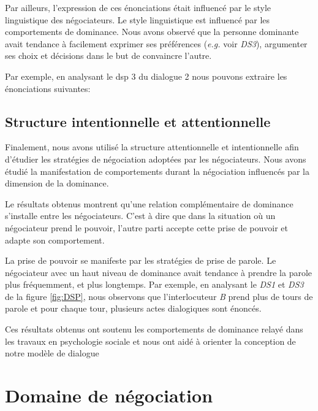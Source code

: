				 Par ailleurs, l'expression de ces énonciations était influencé par le style linguistique des négociateurs.  Le style linguistique est influencé par les comportements de dominance. Nous avons observé que la personne dominante avait tendance à facilement exprimer ses préférences (\emph{e.g.} voir \emph{DS3}), argumenter ses choix et décisions dans le but de convaincre l'autre.  
				 
				 
				  Par exemple, en analysant le dsp 3 du dialogue 2 nous pouvons extraire les énonciations suivantes: 
				 
			\subsection{Structure intentionnelle et attentionnelle}	  
				 
				 Finalement, nous avons utilisé la structure attentionnelle et intentionnelle afin d'étudier les stratégies de négociation adoptées par les négociateurs. Nous avons étudié la manifestation de comportements durant la négociation influencés par la dimension de la dominance.
				 
				 Le résultats obtenus montrent qu'une relation complémentaire de dominance s'installe entre les négociateurs. C'est à dire que dans la situation où un négociateur prend le pouvoir, l'autre parti accepte cette prise de pouvoir et adapte son comportement.
			
				 La prise de pouvoir se manifeste par les stratégies de prise de parole. Le négociateur avec un haut niveau de dominance avait tendance à prendre la parole plus fréquemment, et plus longtemps. Par exemple, en analysant le \emph{DS1} et \emph{DS3} de la figure \ref{fig:DSP}, nous observons que l'interlocuteur \textit{B} prend plus de tours de parole et pour chaque tour, plusieurs actes dialogiques sont énoncés. 
				 
			
			 
			Ces résultats obtenus ont soutenu les comportements de dominance relayé dans les travaux en psychologie sociale et nous ont aidé à orienter la conception de notre modèle de dialogue
			
		
	
	\section{Domaine de négociation}
	\label{domaine}
	
	
